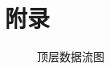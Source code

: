 \documentclass[12pt,hyperref,a4paper,UTF8]{ctexart}
\begin{document}
\section{附录}
\begin{figure}[htbp]
	\label{app01}
	\centering
	\caption{顶层数据流图}
\end{figure}

\end{document}
